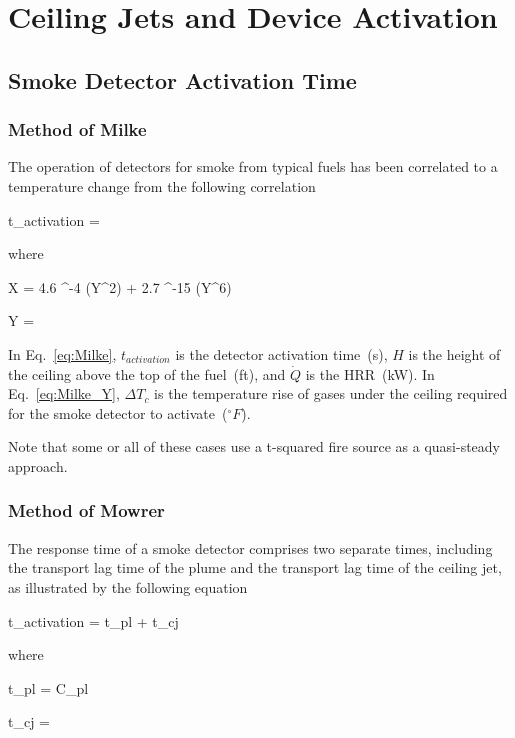 \chapter{Ceiling Jets and Device Activation}

\section{Smoke Detector Activation Time}

\subsection{Method of Milke}

The operation of detectors for smoke from typical fuels has been correlated to a temperature change from the following correlation

\be
t_{activation} = 
\label{eq:Milke}
\ee

\noindent where

\be
X = 4.6 ^{-4} (Y^2) + 2.7 ^{-15} (Y^6)
\label{eq:Milke_X}
\ee

\be
Y = 
\label{eq:Milke_Y}
\ee

In Eq.~\ref{eq:Milke}, $t_{activation}$ is the detector activation time~(s), $H$ is the height of the ceiling above the top of the fuel~(ft), and $\dot Q$ is the HRR~(kW). In Eq.~\ref{eq:Milke_Y}, $\Delta T_c$ is the temperature rise of gases under the ceiling required for the smoke detector to activate~($^\circ F$).

Note that some or all of these cases use a t-squared fire source as a quasi-steady approach.


\clearpage


\subsection{Method of Mowrer}

The response time of a smoke detector comprises two separate times, including the transport lag time of the plume and the transport lag time of the ceiling jet, as illustrated by the following equation

\be
t_{activation} = t_{pl} + t_{cj}
\label{eq:Mowrer}
\ee

\noindent where

\be
t_{pl} = C_{pl} 
\label{eq:Mowrer_tpl}
\ee

\be
t_{cj} =  
\label{eq:Mowrer_tcj}
\ee

